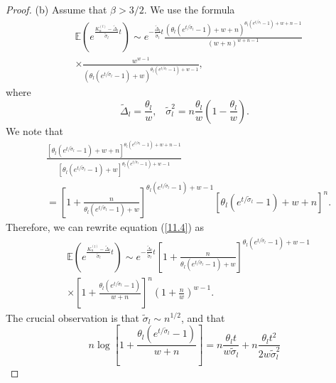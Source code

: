 \documentclass[12pt]{amsart}
\theoremstyle{definition}
\numberwithin{equation}{section}
\begin{document}
\begin{proof}
(b) Assume that $\beta>3/2$.
We use the formula
\begin{equation}\label{11.4}
\begin{split}
&\mathbb{E}\left(e^{\frac{K_n^{(l)}-\tilde{\Delta}_l}{\tilde{\sigma}_l}t}\right)
\sim e^{-\frac{\tilde{\Delta}_l}{\tilde{\sigma}_l}t}
\frac{\left(\theta_l\left(e^{t/\tilde{\sigma}_l}-1\right)+w+n\right)^{\theta_l\left(e^{t/\tilde{\sigma}_l}-1\right)+w+n-1}}{(w+n)^{w+n-1}}\\
&\times
\frac{w^{w-1}}{\left(\theta_l\left(e^{t/\tilde{\sigma}_l}-1\right)+w\right)^{\theta_l\left(e^{t/\tilde{\sigma}_l}-1\right)+w-1}},
\end{split}
\end{equation}
where
\begin{equation}
\tilde{\Delta}_l=\frac{\theta_l}{w},\;\;\;\tilde{\sigma}_l^2=n\frac{\theta_l}{w}
\left(1-\frac{\theta_l}{w}\right).
\end{equation}
We note that
\begin{equation}
\begin{split}
&\frac{\left[\theta_l\left(e^{t/\tilde{\sigma}_l}-1\right)+w+n\right]^{\theta_l\left(e^{t/\tilde{\sigma}_l}-1\right)+w+n-1}}{\left[\theta_l\left(e^{t/\tilde{\sigma}_l}-1\right)+w\right]^{\theta_l\left(e^{t/\tilde{\sigma}_l}-1\right)+w-1}}\\
&=\left[1+\frac{n}{\theta_l\left(e^{t/\tilde{\sigma}_l}-1\right)+w}\right]^{\theta_l\left(e^{t/\tilde{\sigma}_l}-1\right)+w-1}
\left[\theta_l\left(e^{t/\tilde{\sigma}_l}-1\right)+w+n\right]^n.
\end{split}
\end{equation}
Therefore, we can rewrite equation  (\ref{11.4}) as
\begin{equation}\label{11.5}
\begin{split}
&\mathbb{E}\left(e^{\frac{K_n^{(l)}-\tilde{\Delta}_l}{\tilde{\sigma}_l}t}\right)
\sim e^{-\frac{\tilde{\Delta}_l}{\tilde{\sigma}_l}t}
\left[1+\frac{n}{\theta_l\left(e^{t/\tilde{\sigma}_l}-1\right)+w}\right]^{\theta_l\left(e^{t/\tilde{\sigma}_l}-1\right)+w-1}\\
&\times\left[1+\frac{\theta_l\left(e^{t/\tilde{\sigma}_l}-1\right)}{w+n}\right]^n
\left(1+\frac{n}{w}\right)^{w-1}.
\end{split}
\end{equation}
The crucial observation is that $\tilde{\sigma}_l\sim n^{1/2}$, and that
\begin{equation}
n\log\left[1+\frac{\theta_l\left(e^{t/\tilde{\sigma}_l}-1\right)}{w+n}\right]
=n\frac{\theta_lt}{w\tilde{\sigma}_l}+n\frac{\theta_lt^2}{2w\tilde{\sigma}_l^2}

\end{equation}
\end{proof}
\end{document}
